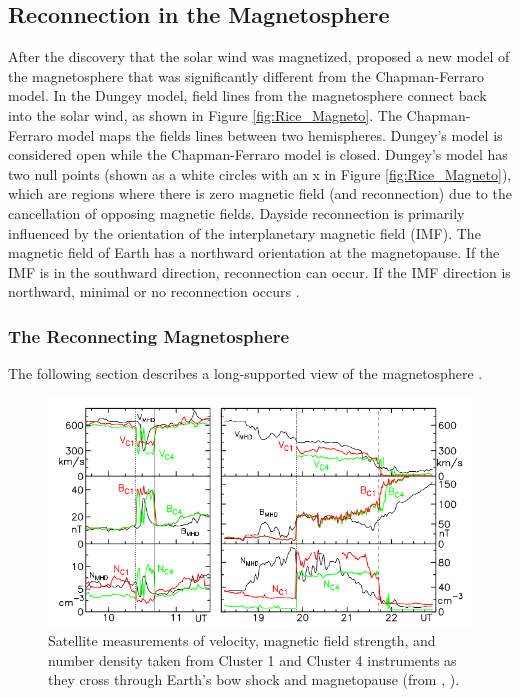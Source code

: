 \subsection{Reconnection in the Magnetosphere}
After the discovery that the solar wind was magnetized, \cite{Dungey1961}
proposed a new model of the magnetosphere that was significantly different from
the Chapman-Ferraro model.
In the Dungey model, field lines from the magnetosphere connect back into the
solar wind, as shown in Figure \ref{fig:Rice_Magneto}. The
Chapman-Ferraro model maps the fields lines between two hemispheres. Dungey's
model is considered open while the Chapman-Ferraro model is closed. Dungey's
model has two null points (shown as a white circles with an x in Figure
\ref{fig:Rice_Magneto}), which are regions where there is zero magnetic
field (and reconnection) due to the cancellation of opposing magnetic fields.
Dayside reconnection is primarily influenced by the orientation of the
interplanetary magnetic field (IMF). The magnetic field of Earth has a
northward orientation at the magnetopause. If the IMF is in the southward
direction, reconnection can occur. If the IMF direction is northward, minimal
or no reconnection occurs \citep{Priest}.

\subsubsection[The Reconnecting Magnetosphere]{The Reconnecting Magnetosphere}
\label{ReconnectingMagnetosphere}
The following section describes a long-supported view of the magnetosphere \citep{Kennel}.

\begin{figure}
	\centering
	\includegraphics[scale=0.5]{images/MPandShock_VBN.png}
	\caption{Satellite measurements of velocity, magnetic field strength, and
	number density taken from Cluster 1 and Cluster 4 instruments as they
	cross through Earth's bow shock and magnetopause (from
	\citeauthor{Tatrallyay2012}, \citeyear{Tatrallyay2012}).}
    \label{fig:MPandShock_VBN}
	\figSpace
\end{figure}

